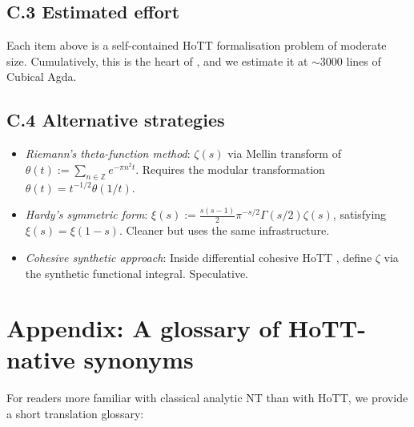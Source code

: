 \documentclass[12pt]{article}
\theoremstyle{definition}
\theoremstyle{remark}
\newcommand{\Z}{\mathbb{Z}}
\begin{document}
\subsection*{C.3 Estimated effort}

Each item above is a self-contained HoTT formalisation problem of moderate
size. Cumulatively, this is the heart of , and we estimate
it at $\sim 3000$ lines of Cubical Agda.

\subsection*{C.4 Alternative strategies}

\begin{itemize}
\item \emph{Riemann's theta-function method}: $\zeta(s)$ via Mellin transform
of $\theta(t) := \sum_{n \in \Z} e^{-\pi n^2 t}$. Requires the modular
transformation $\theta(t) = t^{-1/2}\theta(1/t)$.
\item \emph{Hardy's symmetric form}: $\xi(s) := \frac{s(s-1)}{2}\pi^{-s/2}
\Gamma(s/2)\zeta(s)$, satisfying $\xi(s) = \xi(1-s)$. Cleaner but uses the
same infrastructure.
\item \emph{Cohesive synthetic approach}: Inside differential cohesive HoTT
\cite{Schreiber2013}, define $\zeta$ via the synthetic functional integral.
Speculative.
\end{itemize}

\section{Appendix: A glossary of HoTT-native synonyms}\label{app:glossary}

For readers more familiar with classical analytic NT than with HoTT, we
provide a short translation glossary:

\medskip
\end{document}
